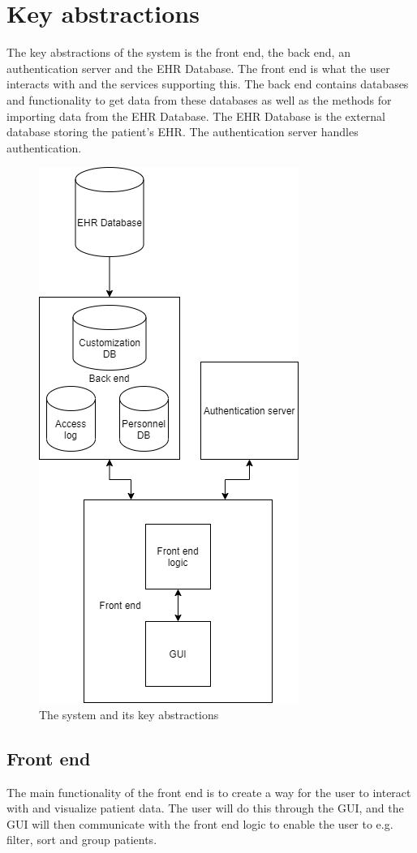 \documentclass{article}
\begin{document}
\section{Key abstractions}
The key abstractions of the system is the front end, the back end, an authentication server and the EHR Database. The front end is what the user interacts with and the services supporting this. The back end contains databases and functionality to get data from these databases as well as the methods for importing data from the EHR Database. The EHR Database is the external database storing the patient's EHR. The authentication server handles authentication.

\begin{figure}[h]
    \centering
    \includegraphics[scale = 0.5]{key-abstraction}
    \caption{The system and its key abstractions}
    \label{fig:key-abstractions}
\end{figure}


\subsection{Front end}
The main functionality of the front end is to create a way for the user to interact with and visualize patient data. The user will do this through the GUI, and the GUI will then communicate with the front end logic to enable the user to e.g. filter, sort and group patients. 
\end{document}
